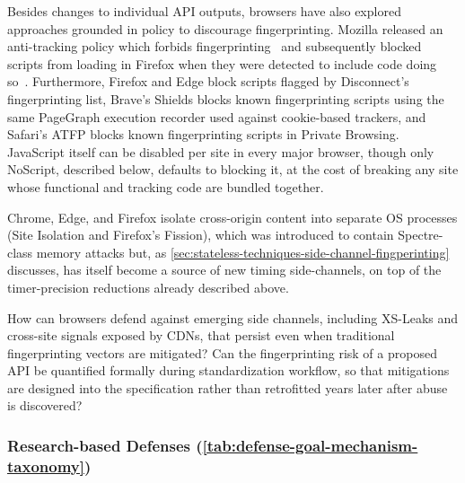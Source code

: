 %
Besides changes to individual API outputs, browsers have also explored approaches grounded in policy to discourage fingerprinting.
%
Mozilla released an anti-tracking policy which forbids fingerprinting~\cite{mozillaSecurityTrackingPolicy2019} and subsequently blocked scripts from loading in Firefox when they were detected to include code doing so~\cite{englehardtFirefox72Blocks2020}.
%
Furthermore, Firefox and Edge block scripts flagged by Disconnect's fingerprinting list, Brave's Shields blocks known fingerprinting scripts using the same PageGraph execution recorder used against cookie-based trackers, and Safari's ATFP blocks known fingerprinting scripts in Private Browsing.
%
JavaScript itself can be disabled per site in every major browser, though only NoScript, described below, defaults to blocking it, at the cost of breaking any site whose functional and tracking code are bundled together.



%
Chrome, Edge, and Firefox isolate cross-origin content into separate OS processes (Site Isolation and Firefox's Fission), which was introduced to contain Spectre-class memory attacks but, as \autoref{sec:stateless-techniques-side-channel-fingperinting} discusses, has itself become a source of new timing side-channels, on top of the timer-precision reductions already described above.


\begin{opbox}
How can browsers defend against emerging side channels, including XS-Leaks and cross-site signals exposed by CDNs, that persist even when traditional fingerprinting vectors are mitigated? Can the fingerprinting risk of a proposed API be quantified formally during standardization workflow, so that mitigations are designed into the specification rather than retrofitted years later after abuse is discovered?
\end{opbox}




\subsubsection{Research-based Defenses (\autoref{tab:defense-goal-mechanism-taxonomy})}
\label{sec:stateless-defenses-research}



